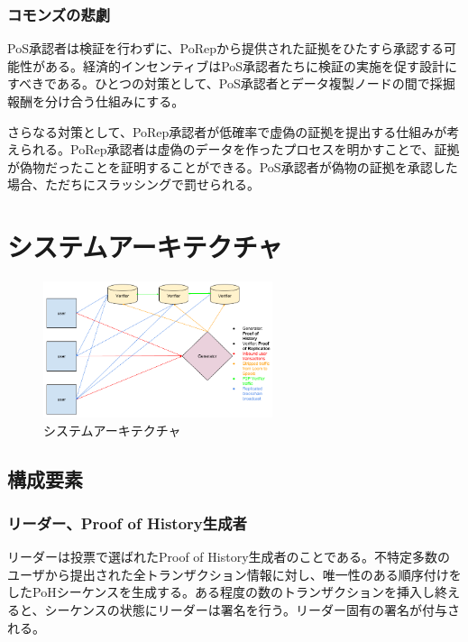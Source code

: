 \documentclass[12pt]{ltjsarticle}
\begin{document}
\subsubsection{コモンズの悲劇}

PoS承認者は検証を行わずに、PoRepから提供された証拠をひたすら承認する可能性がある。経済的インセンティブはPoS承認者たちに検証の実施を促す設計にすべきである。ひとつの対策として、PoS承認者とデータ複製ノードの間で採掘報酬を分け合う仕組みにする。

さらなる対策として、PoRep承認者が低確率で虚偽の証拠を提出する仕組みが考えられる。PoRep承認者は虚偽のデータを作ったプロセスを明かすことで、証拠が偽物だったことを証明することができる。PoS承認者が偽物の証拠を承認した場合、ただちにスラッシングで罰せられる。

\section{システムアーキテクチャ}\label{system_architecture}

\begin{figure}
  \begin{center}
    \centering
    \includegraphics[width=0.6\textwidth]{../../figures/fig_9.png}
    \caption[図9]{システムアーキテクチャ \label{fig_9}}
  \end{center}
  \end{figure}

\subsection{構成要素}

\subsubsection{リーダー、Proof of History生成者}
リーダーは投票で選ばれたProof of History生成者のことである。不特定多数のユーザから提出された全トランザクション情報に対し、唯一性のある順序付けをしたPoHシーケンスを生成する。ある程度の数のトランザクションを挿入し終えると、シーケンスの状態にリーダーは署名を行う。リーダー固有の署名が付与される。
\end{document}
